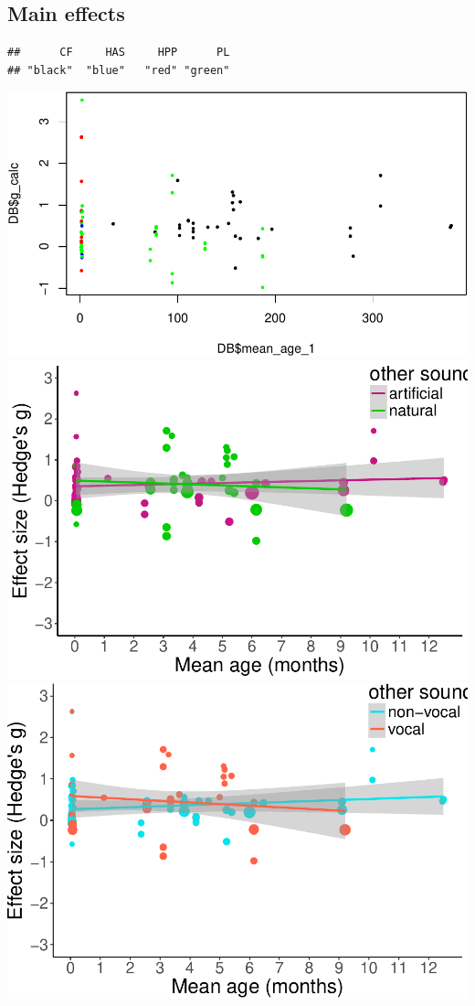 \documentclass[]{apa6}
\begin{document}
\subsection{Main effects}\label{main-effects}

\begin{verbatim}
##      CF     HAS     HPP      PL 
## "black"  "blue"   "red" "green"
\end{verbatim}

\includegraphics{MA_speech_pref_files/figure-latex/plots-1.pdf}
\includegraphics{MA_speech_pref_files/figure-latex/plots-2.pdf}
\includegraphics{MA_speech_pref_files/figure-latex/plots-3.pdf}
\end{document}
